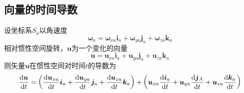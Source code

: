 \subsection{向量的时间导数}
设坐标系$S_a$以角速度
\begin{equation}
	\bm{\omega}_a = \bm{\omega}_{xa} \bm{i}_a + \bm{\omega}_{ya} \bm{j}_a + \bm{\omega}_{za} \bm{k}_a 
\end{equation}
相对惯性空间旋转，$\bm{u}$为一个变化的向量
\begin{equation*}
	\bm{u} = \bm{u}_{xa} \bm{i}_a + \bm{u}_{ya} \bm{j}_a + \bm{u}_{za} \bm{k}_a
\end{equation*}
则矢量$\bm{u}$在惯性空间对时间$t$的导数为
\begin{equation}
	\dfrac{{\rm{d}} \bm{u}}{{\rm{d}} t} = \left( \dfrac{{\rm{d}} \bm{u}_{xa}}{{\rm{d}} t}\bm{i}_a + \dfrac{{\rm{d}} \bm{u}_{ya}}{{\rm{d}} t} \bm{j}_a + \dfrac{{\rm{d}} \bm{u}_{za}}{{\rm{d}} t} \bm{k}_a \right) + \left(\bm{u}_{xa} \dfrac{{\rm{d}} \bm{i}_a}{{\rm{d}} t} + \bm{u}_{ya} \dfrac{{\rm{d}} \bm{j}_A}{{\rm{d}} t} + \bm{u}_{za} \dfrac{{\rm{d}} \bm{k}_a}{{\rm{d}} t}\right)
\end{equation}
\vspace*{0.1em}

